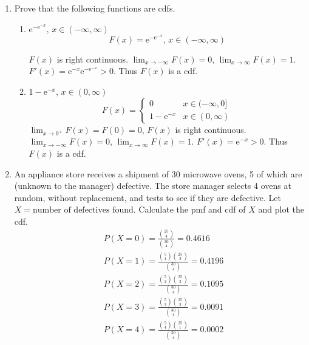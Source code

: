 \documentclass[letter]{article}
\begin{document}
\begin{enumerate}[leftmargin = 0 em, label = \arabic*., font = \bfseries]
	\item Prove that the following functions are cdfs.
	\begin{enumerate}[leftmargin = 0em, start = 3]
		\item $\mathrm{e}^{-\mathrm{e}^{-x}},\, x\in (-\infty, \infty)$
		\[F(x) = \mathrm{e}^{\mathrm{-e}^{-x}},\, x\in (-\infty, \infty)\]

		 $F(x)$ is right continuous. 
		 $\lim_{x\to -\infty} F(x) = 0, \, \lim_{x\to \infty} F(x) = 1$. 
		 $F'(x) = \mathrm{e}^{-x} \mathrm{e}^{-\mathrm{e}^{-x}} >0$. Thus $F(x)$ is a cdf.
		\item $1 - \mathrm{e}^{-x},\, x\in (0, \infty)$
		\[F(x) = \begin{cases}
		0& x\in (-\infty, 0]\\
		1 - \mathrm{e}^{-x} & x\in (0, \infty)
		\end{cases}\]
		$\lim_{x\to 0^{+}} F(x) = F(0) = 0$, $F(x)$ is right continuous. $\lim_{x\to -\infty} F(x) =0,\, \lim_{x\to \infty} F(x) = 1$. $F'(x) = \mathrm{e}^{-x} >0$. Thus $F(x)$ is a cdf.
	\end{enumerate}
	
	\item An appliance store receives a shipment of 30 microwave ovens, 5 of which are (unknown to the manager) defective. The store manager selects 4 ovens at random, without replacement, and tests to see if they are defective. Let $X = \textrm{number of defectives found}$. Calculate the pmf and cdf of $X$ and plot the cdf.
	\begin{align*}
	&P(X = 0) = \frac{\binom{25}{4}}{\binom{30}{4}} = 0.4616\\
	&P(X = 1) = \frac{\binom{5}{1}\binom{25}{3}}{\binom{30}{4}} = 0.4196\\
	&P(X = 2) = \frac{\binom{5}{2}\binom{25}{2}}{\binom{30}{4}} =  0.1095\\
	&P(X = 3) = \frac{\binom{5}{3}\binom{25}{2}}{\binom{30}{4}} =  0.0091\\
	&P(X = 4) = \frac{\binom{5}{4}\binom{25}{1}}{\binom{30}{4}} = 0.0002
	\end{align*}


\end{enumerate}
\end{document}
